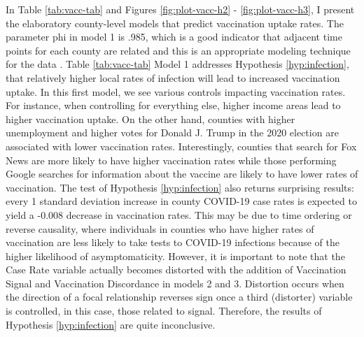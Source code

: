 In Table \ref{tab:vacc-tab} and Figures \ref{fig:plot-vacc-h2} -
\ref{fig:plot-vacc-h3}, I present the elaboratory county-level models that
predict vaccination uptake rates. The parameter phi in model 1 is .985, which is
a good indicator that adjacent time points for each county are related and this
is an appropriate modeling technique for the data \citep{finch_etal14}. Table
\ref{tab:vacc-tab} Model 1 addresses Hypothesis \ref{hyp:infection}, that
relatively higher local rates of infection will lead to increased vaccination
uptake. In this first model, we see various controls impacting vaccination
rates. For instance, when controlling for everything else, higher income areas
lead to higher vaccination uptake. On the other hand, counties with higher
unemployment and higher votes for Donald J. Trump in the 2020 election are
associated with lower vaccination rates. Interestingly, counties that search for
Fox News are more likely to have higher vaccination rates while those performing
Google searches for information about the vaccine are likely to have lower rates
of vaccination. 
The test of Hypothesis \ref{hyp:infection} also returns
surprising results: every 1 standard deviation increase in county COVID-19 case
rates is expected to yield a -0.008 decrease in vaccination rates. This may be
due to time ordering or reverse causality, where individuals in counties who
have higher rates of vaccination are less likely to take tests to COVID-19
infections because of the higher likelihood of asymptomaticity. However, it is
important to note that the Case Rate variable actually becomes distorted with
the addition of Vaccination Signal and Vaccination Discordance in models 2 and
3. Distortion occurs when the direction of a focal relationship reverses sign
once a third (distorter) variable is controlled, in this case, those related to
signal. Therefore, the results of Hypothesis \ref{hyp:infection} are quite
inconclusive.


